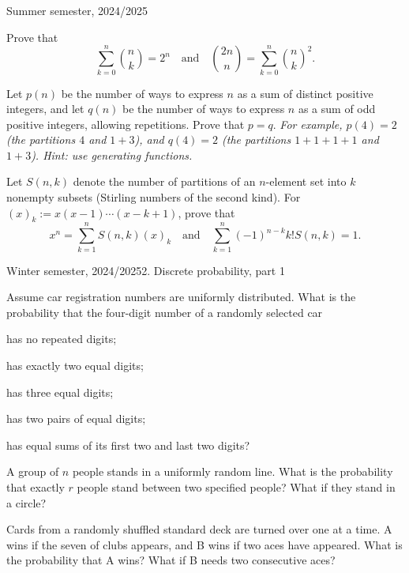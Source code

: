 \documentclass[a4paper]{report}
\begin{document}
\noindent Summer semester, 2024/2025
\begin{problem}
Prove that
\[\sum_{k=0}^n\binom nk=2^n\quad\text{and}\quad\binom{2n}n=\sum_{k=0}^n\binom nk^2.\]
\end{problem}
\begin{problemstar}
Let $p(n)$ be the number of ways to express $n$ as a sum of distinct positive integers, and let $q(n)$ be the number of ways to express $n$ as a sum of odd positive integers, allowing repetitions. Prove that $p=q$.
\textit{For example, $p(4)=2$ (the partitions $4$ and $1+3$), and $q(4)=2$ (the partitions $1+1+1+1$ and $1+3$). Hint: use generating functions.}
\end{problemstar}
\begin{problemstar}
Let $S(n,k)$ denote the number of partitions of an $n$-element set into $k$ nonempty subsets (Stirling numbers of the second kind). For $(x)_k:=x(x-1)\cdots(x-k+1)$, prove that
\[x^n=\sum_{k=1}^nS(n,k)(x)_k\quad\text{and}\quad\sum_{k=1}^n(-1)^{n-k}k!S(n,k)=1.\]
\end{problemstar}
\pagebreak
\noindent Winter semester, 2024/2025\hfill 2. Discrete probability, part 1
\par\noindent\hrulefill\par
\begin{problem}
Assume car registration numbers are uniformly distributed. What is the probability that the four-digit number of a randomly selected car
\begin{enumeratea}
\item has no repeated digits;
\item has exactly two equal digits;
\item has three equal digits;
\item has two pairs of equal digits;
\item has equal sums of its first two and last two digits?
\end{enumeratea}
\end{problem}
\begin{problem}
A group of $n$ people stands in a uniformly random line. What is the probability that exactly $r$ people stand between two specified people? What if they stand in a circle?
\end{problem}
\begin{problembook}
Cards from a randomly shuffled standard deck are turned over one at a time. A wins if the seven of clubs appears, and B wins if two aces have appeared. What is the probability that A wins? What if B needs two consecutive aces?
\end{problembook}
\end{document}

